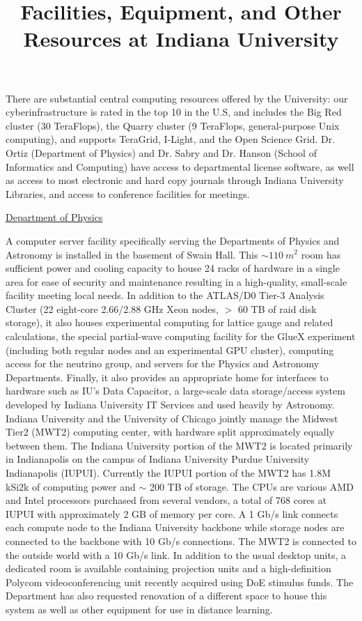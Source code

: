 \documentclass[11pt]{article}
\begin{document}
\title{Facilities, Equipment, and Other Resources at Indiana University}
\author{}
\date{}
\maketitle


\noindent There are substantial central computing resources offered by
the University: our cyberinfrastructure is rated in the top 10 in the
U.S, and includes the Big Red cluster (30 TeraFlops), the Quarry
cluster (9 TeraFlops, general-purpose Unix computing), and supports
TeraGrid, I-Light, and the Open Science Grid. Dr. Ortiz (Department of
Physics) and Dr. Sabry and Dr. Hanson (School of Informatics and
Computing) have access to departmental license software, as well as
access to most electronic and hard copy journals through Indiana
University Libraries, and access to conference facilities for
meetings.

\bigskip
\centerline{\Large{\underline{Department of Physics}}}
\bigskip

\noindent A computer server facility specifically serving the
Departments of Physics and Astronomy is installed in the basement of
Swain Hall. This $\sim 110~m^2$ room has sufficient power and cooling
capacity to house 24 racks of hardware in a single area for ease of
security and maintenance resulting in a high-quality, small-scale
facility meeting local needs. In addition to the ATLAS/D0 Tier-3
Analysis Cluster (22 eight-core 2.66/2.88 GHz Xeon nodes, $>$ 60 TB of
raid disk storage), it also houses experimental computing for lattice
gauge and related calculations, the special partial-wave computing
facility for the GlueX experiment (including both regular nodes and an
experimental GPU cluster), computing access for the neutrino group,
and servers for the Physics and Astronomy Departments. Finally, it
also provides an appropriate home for interfaces to hardware such as
IU's Data Capacitor, a large-scale data storage/access system
developed by Indiana University IT Services and used heavily by
Astronomy.  Indiana University and the University of Chicago jointly
manage the Midwest Tier2 (MWT2) computing center, with hardware split
approximately equally between them. The Indiana University portion of
the MWT2 is located primarily in Indianapolis on the campus of Indiana
University Purdue University Indianapolis (IUPUI). Currently the IUPUI
portion of the MWT2 has 1.8M kSi2k of computing power and $\sim$ 200
TB of storage. The CPUs are various AMD and Intel processors purchased
from several vendors, a total of 768 cores at IUPUI with approximately
2 GB of memory per core. A 1 Gb/s link connects each compute node to
the Indiana University backbone while storage nodes are connected to
the backbone with 10 Gb/s connections. The MWT2 is connected to the
outside world with a 10 Gb/s link.  In addition to the usual desktop
units, a dedicated room is available containing projection units and a
high-definition Polycom videoconferencing unit recently acquired using
DoE stimulus funds. The Department has also requested renovation of a
different space to house this system as well as other equipment for
use in distance learning.
\end{document}
